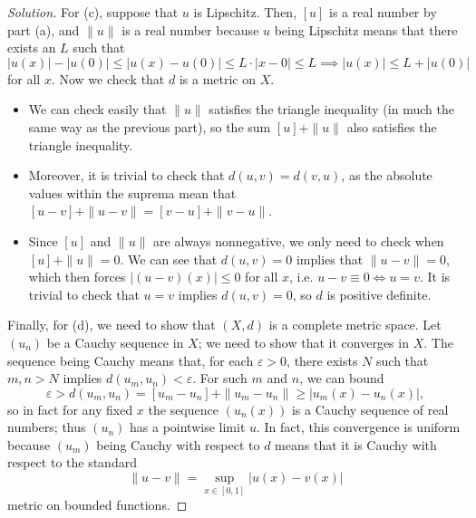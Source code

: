 \documentclass[11pt]{scrartcl}
\providecommand{\eps}{\varepsilon}
\providecommand{\ii}{\item}
\newenvironment{soln}{\begin{proof}[Solution]}{\end{proof}}
\begin{document}
\begin{soln}
	For (c), suppose that $u$ is Lipschitz. Then, $[u]$ is a real number
	by part (a), and $\|u\|$ is a real number because
	$u$ being Lipschitz means that there exists an $L$ such that
	\[|u(x)| - |u(0)| \le |u(x) - u(0)| \le L\cdot|x - 0| \le L
	\implies |u(x)| \le L + |u(0)|\]
	for all $x$. Now we check that $d$ is a metric on $X$.
	\begin{itemize}
		\ii We can check easily that $\|u\|$ satisfies
		the triangle inequality (in much the same way as the previous part),
		so the sum $[u] + \|u\|$ also satisfies the triangle inequality.
		\ii Moreover, it is trivial to check that $d(u, v) = d(v, u)$,
		as the absolute values within the suprema
		mean that $[u-v] + \|u-v\| = [v-u] + \|v-u\|$.
		\ii Since $[u]$ and $\|u\|$ are always nonnegative,
		we only need to check when $[u] + \|u\| = 0$.
		We can see that $d(u, v) = 0$ implies that $\|u-v\| = 0$,
		which then forces $|(u-v)(x)| \le 0$ for all $x$, i.e.
		$u - v\equiv 0\iff u = v$. It is trivial to check that
		$u = v$ implies $d(u, v) = 0$, so $d$ is positive definite.
	\end{itemize}

	Finally, for (d), we need to show that $(X, d)$ is a complete metric space.
	Let $(u_n)$ be a Cauchy sequence in $X$; we need to show that
	it converges in $X$. The sequence being Cauchy means that,
	for each $\eps > 0$, there exists $N$ such that $m,n > N$ implies
	$d(u_m, u_n) < \eps$. For such $m$ and $n$, we can bound
	\[\eps > d(u_m, u_n) = [u_m - u_n] + \|u_m - u_n\| \ge |u_m(x) - u_n(x)|,\]
	so in fact for any fixed $x$ the sequence $(u_n(x))$ is a Cauchy sequence
	of real numbers; thus $(u_n)$ has a pointwise limit $u$.
	In fact, this convergence is uniform
	because $(u_m)$ being Cauchy with respect to $d$
	means that it is Cauchy with respect to the standard
	\[\|u - v\| = \sup_{x\in [0,1]} |u(x) - v(x)|\]
	metric on bounded functions.
	

\end{soln}
\end{document}
